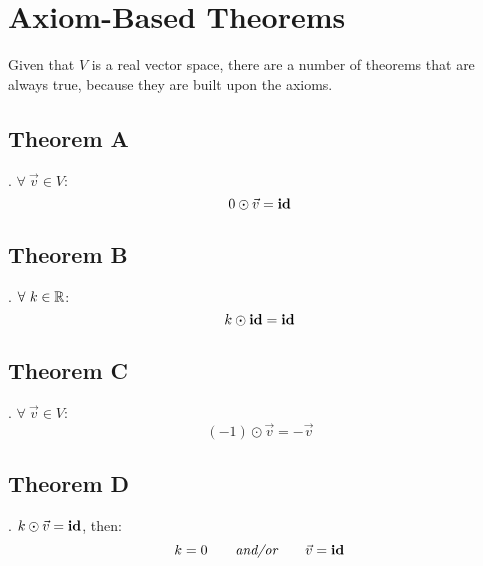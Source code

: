 \section{Axiom-Based Theorems}
Given that $V$ is a real vector space, there are a number of
theorems that are always true, because they are built upon the axioms.

\subsection*{Theorem A}
.
$\forall~\vec{v} \in V$:
\[
  0 \odot \vec{v} = \operatorname{\textbf{id}}
\]

\subsection*{Theorem B}
.
$\forall~k \in \mathbb{R}$:
\[
  k \odot \operatorname{\textbf{id}} = \operatorname{\textbf{id}}
\]

\subsection*{Theorem C}
.
$\forall~\vec{v} \in V$:
\[
  (-1) \odot \vec{v} = -\vec{v}
\]

\subsection*{Theorem D}
.
 $k \odot \vec{v} = \operatorname{\textbf{id}}$, then:
\[
  k = 0\qquad\textit{and/or}\qquad\vec{v} = \operatorname{\textbf{id}}
\]